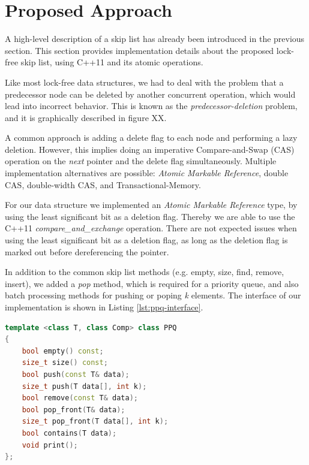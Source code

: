 \section{Proposed Approach}\label{sec:approach}
A high-level description of a skip list has already been introduced in the previous section.
This section provides implementation details about the proposed lock-free skip list, using C++11 and its atomic operations.

Like most lock-free data structures, we had to deal with the problem that a predecessor node can be deleted by another concurrent operation, which would lead into incorrect behavior. This is known as the {\em predecessor-deletion} problem, and it is graphically described in figure XX.%

A common approach is adding a delete flag to each node and performing a lazy deletion. However, this implies doing an imperative Compare-and-Swap (CAS) operation on the {\em next} pointer and the delete flag simultaneously.
Multiple implementation alternatives are possible: {\em Atomic Markable Reference}, double CAS, double-width CAS, and Transactional-Memory.

For our data structure we implemented an {\em Atomic Markable Reference} type, by using the least significant bit as a deletion flag. Thereby we are able to use the C++11 {\em compare\_and\_exchange} operation.
There are not expected issues when using the least significant bit as a deletion flag, as long as the deletion flag is marked out before dereferencing the pointer.

In addition to the common skip list methods (e.g. empty, size, find, remove, insert), we added a \textit{pop} method, which is required for a priority queue, and also batch processing methods for pushing or poping \textit{k} elements.
The interface of our implementation is shown in Listing \ref{lst:ppq-interface}.

\begin{lstlisting}[language=C++,basicstyle=\tt\footnotesize,captionpos=b,caption=PPQ interface,morekeywords={*, size_t},label=lst:ppq-interface]
template <class T, class Comp> class PPQ
{
	bool empty() const;
	size_t size() const;
	bool push(const T& data);
	size_t push(T data[], int k);
	bool remove(const T& data);
	bool pop_front(T& data);
	size_t pop_front(T data[], int k);
	bool contains(T data);
	void print();
};
\end{lstlisting}


